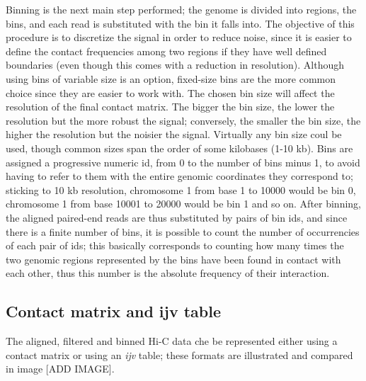 Binning is the next main step performed; the genome is divided into regions, the bins, and each read is substituted with the bin it falls into. The objective of this procedure is to discretize the signal in order to reduce noise, since it is easier to define the contact frequencies among two regions if they have well defined boundaries (even though this comes with a reduction in resolution).
Although using bins of variable size is an option, fixed-size bins are the more common choice since they are easier to work with. The chosen bin size will affect the resolution of the final contact matrix. The bigger the bin size, the lower the resolution but the more robust the signal; conversely, the smaller the bin size, the higher the resolution but the noisier the signal. Virtually any bin size coul be used, though common sizes span the order of some kilobases (1-10 kb). Bins are assigned a progressive numeric id, from 0 to the number of bins minus 1, to avoid having to refer to them with the entire genomic coordinates they correspond to; sticking to 10 kb resolution, chromosome 1 from base 1 to 10000 would be bin 0, chromosome 1 from base 10001 to 20000 would be bin 1 and so on. After binning, the aligned paired-end reads are thus substituted by pairs of bin ids, and since there is a finite number of bins, it is possible to count the number of occurrencies of each pair of ids; this basically corresponds to counting how many times the two genomic regions represented by the bins have been found in contact with each other, thus this number is the absolute frequency of their interaction. 

\subsection{Contact matrix and ijv table}

The aligned, filtered and binned Hi-C data che be represented either using a contact matrix or using an \emph{ijv} table; these formats are illustrated and compared in image [ADD IMAGE].

